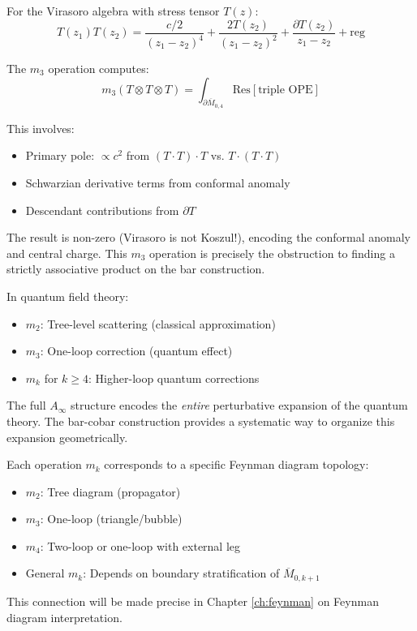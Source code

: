 \begin{example}
For the Virasoro algebra with stress tensor $T(z)$:
$$T(z_1)T(z_2) = \frac{c/2}{(z_1-z_2)^4} + \frac{2T(z_2)}{(z_1-z_2)^2} + 
\frac{\partial T(z_2)}{z_1-z_2} + \text{reg}$$

The $m_3$ operation computes:
$$m_3(T \otimes T \otimes T) = 
\int_{\partial \overline{M}_{0,4}} \text{Res}[\text{triple OPE}]$$

This involves:
\begin{itemize}
\item Primary pole: $\propto c^2$ from $(T \cdot T) \cdot T$ vs. $T \cdot (T \cdot T)$
\item Schwarzian derivative terms from conformal anomaly
\item Descendant contributions from $\partial T$
\end{itemize}

The result is non-zero (Virasoro is not Koszul!), encoding the conformal anomaly 
and central charge. This $m_3$ operation is precisely the obstruction to finding 
a strictly associative product on the bar construction.
\end{example}

\begin{remark}
In quantum field theory:
\begin{itemize}
\item $m_2$: Tree-level scattering (classical approximation)
\item $m_3$: One-loop correction (quantum effect)
\item $m_k$ for $k \geq 4$: Higher-loop quantum corrections
\end{itemize}
The full $A_\infty$ structure encodes the \emph{entire} perturbative expansion 
of the quantum theory. The bar-cobar construction provides a systematic way to 
organize this expansion geometrically.
\end{remark}

\begin{remark}
Each operation $m_k$ corresponds to a specific Feynman diagram topology:
\begin{itemize}
\item $m_2$: Tree diagram (propagator)
\item $m_3$: One-loop (triangle/bubble)
\item $m_4$: Two-loop or one-loop with external leg
\item General $m_k$: Depends on boundary stratification of $\overline{M}_{0,k+1}$
\end{itemize}
This connection will be made precise in Chapter \ref{ch:feynman} on Feynman diagram interpretation.
\end{remark}

